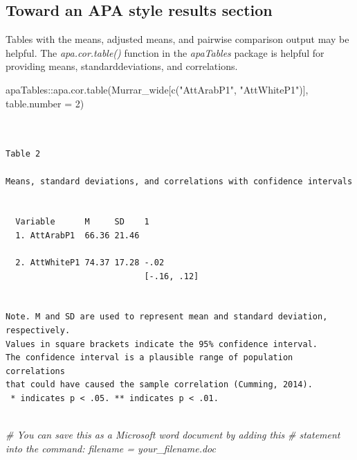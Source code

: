 \documentclass[
  11pt,
]{book}
\newenvironment{Shaded}{\begin{snugshade}}{\end{snugshade}}
\newcommand{\AttributeTok}[1]{\textcolor[rgb]{0.77,0.63,0.00}{#1}}
\newcommand{\CommentTok}[1]{\textcolor[rgb]{0.56,0.35,0.01}{\textit{#1}}}
\newcommand{\DecValTok}[1]{\textcolor[rgb]{0.00,0.00,0.81}{#1}}
\newcommand{\FunctionTok}[1]{\textcolor[rgb]{0.00,0.00,0.00}{#1}}
\newcommand{\NormalTok}[1]{#1}
\newcommand{\SpecialCharTok}[1]{\textcolor[rgb]{0.00,0.00,0.00}{#1}}
\newcommand{\StringTok}[1]{\textcolor[rgb]{0.31,0.60,0.02}{#1}}
\begin{document}
\hypertarget{toward-an-apa-style-results-section-1}{%
\subsection{Toward an APA style results section}\label{toward-an-apa-style-results-section-1}}

Tables with the means, adjusted means, and pairwise comparison output may be helpful. The \emph{apa.cor.table()} function in the \emph{apaTables} package is helpful for providing means, standarddeviations, and correlations.

\begin{Shaded}
\begin{Highlighting}[]
\NormalTok{apaTables}\SpecialCharTok{::}\FunctionTok{apa.cor.table}\NormalTok{(Murrar\_wide[}\FunctionTok{c}\NormalTok{(}\StringTok{"AttArabP1"}\NormalTok{, }\StringTok{"AttWhiteP1"}\NormalTok{)], }\AttributeTok{table.number =} \DecValTok{2}\NormalTok{)}
\end{Highlighting}
\end{Shaded}

\begin{verbatim}


Table 2 

Means, standard deviations, and correlations with confidence intervals
 

  Variable      M     SD    1          
  1. AttArabP1  66.36 21.46            
                                       
  2. AttWhiteP1 74.37 17.28 -.02       
                            [-.16, .12]
                                       

Note. M and SD are used to represent mean and standard deviation, respectively.
Values in square brackets indicate the 95% confidence interval.
The confidence interval is a plausible range of population correlations 
that could have caused the sample correlation (Cumming, 2014).
 * indicates p < .05. ** indicates p < .01.
 
\end{verbatim}

\begin{Shaded}
\begin{Highlighting}[]
\CommentTok{\# You can save this as a Microsoft word document by adding this}
\CommentTok{\# statement into the command: filename = \textquotesingle{}your\_filename.doc\textquotesingle{}}
\end{Highlighting}
\end{Shaded}
\end{document}
